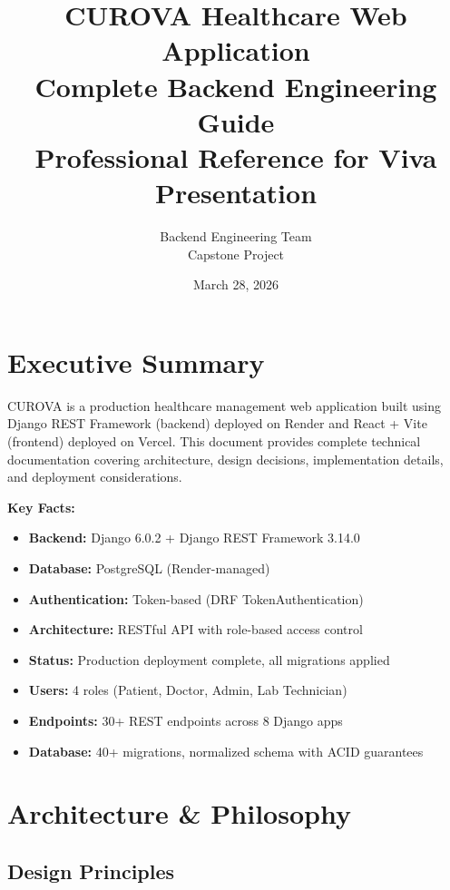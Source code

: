 \documentclass[11pt,a4paper,twoside]{report}
\title{%
    \Huge \textbf{CUROVA Healthcare Web Application} \\[2ex]
    \Large Complete Backend Engineering Guide \\[2ex]
    \large Professional Reference for Viva Presentation
}
\author{%
    Backend Engineering Team \\
    Capstone Project
}
\date{March 28, 2026}
\begin{document}
\maketitle
\newpage

\tableofcontents
\newpage

\chapter*{Executive Summary}

CUROVA is a production healthcare management web application built using Django REST Framework (backend) deployed on Render and React + Vite (frontend) deployed on Vercel. This document provides complete technical documentation covering architecture, design decisions, implementation details, and deployment considerations.

\textbf{Key Facts:}
\begin{itemize}
    \item \textbf{Backend:} Django 6.0.2 + Django REST Framework 3.14.0
    \item \textbf{Database:} PostgreSQL (Render-managed)
    \item \textbf{Authentication:} Token-based (DRF TokenAuthentication)
    \item \textbf{Architecture:} RESTful API with role-based access control
    \item \textbf{Status:} Production deployment complete, all migrations applied
    \item \textbf{Users:} 4 roles (Patient, Doctor, Admin, Lab Technician)
    \item \textbf{Endpoints:} 30+ REST endpoints across 8 Django apps
    \item \textbf{Database:} 40+ migrations, normalized schema with ACID guarantees
\end{itemize}

\newpage

\chapter{Architecture \& Philosophy}

\section{Design Principles}
\end{document}
